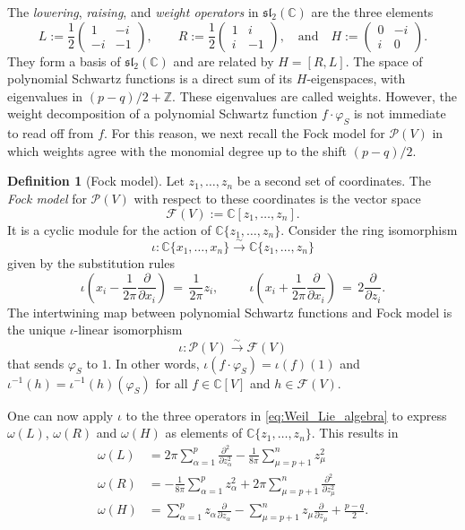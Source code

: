 \documentclass[reqno, 11pt]{amsart} %
\numberwithin{equation}{section}
\theoremstyle{plain}
\theoremstyle{definition}
\newtheorem{definition}[theorem]{Definition}
\theoremstyle{remark}
\newcommand{\lr}{\longrightarrow}
\newcommand{\mbC}{\mathbb{C}}
\newcommand{\mbZ}{\mathbb{Z}}
\newcommand{\mcF}{\mathcal{F}}
\newcommand{\mcP}{\mathcal{P}}
\newcommand{\mfl}{\mathfrak{l}}
\newcommand{\mfs}{\mathfrak{s}}
\newcommand{\mfsl}{\mfs\mfl}
\newcommand{\simlr}{\overset{\sim}{\lr}}
\begin{document}
The \emph{lowering}, \emph{raising}, and \emph{weight operators} in $\mfsl_2(\mbC)$ are the three elements
\begin{equation}\label{eq:LRH}
L := \frac12 \begin{pmatrix}  1 & -i \\ -i  & -1 \end{pmatrix}, \qquad R := \frac12 \begin{pmatrix} 1 &i \\ i & -1 \end{pmatrix} , \quad\text{and}\quad H := \begin{pmatrix} 0 & -i \\ i & 0 \end{pmatrix}.
\end{equation}
They form a basis of $\mfsl_2(\mbC)$ and are related by $H = [R,L]$. The space of polynomial Schwartz functions is a direct sum of its $H$-eigenspaces, with eigenvalues in $(p-q)/2 + \mbZ$. These eigenvalues are called weights. However, the weight decomposition of a polynomial Schwartz function $f\cdot φ_S$ is not immediate to read off from $f$. For this reason, we next recall the Fock model for $\mcP(V)$ in which weights agree with the monomial degree up to the shift $(p-q)/2$.
\begin{definition}[Fock model]\label{def:Fock}
Let $z_1,\ldots,z_n$ be a second set of coordinates. The \emph{Fock model} for $\mcP(V)$ with respect to these coordinates is the vector space
$$\mcF(V) := \mbC[z_1,\ldots,z_n].$$
It is a cyclic module for the action of $\mbC\{z_1,\ldots,z_n\}$. Consider the ring isomorphism
$$ι:\mbC\{x_1,\ldots,x_n\} \simlr \mbC\{z_1,\ldots,z_n\}$$
given by the substitution rules
\begin{equation}\label{eq:Fock_model_intertwiner}
ι\left(x_i - \frac{1}{2π}\frac{\partial}{\partial x_i}\right)\, =\, \frac{1}{2π} z_i, \ \qquad\ ι\left(x_i + \frac{1}{2π}\frac{\partial}{\partial x_i}\right)\, =\, 2 \frac{\partial}{\partial z_i}.
\end{equation}
The intertwining map between polynomial Schwartz functions and Fock model is the unique $ι$-linear isomorphism
$$ι:\mcP(V)\simlr \mcF(V)$$
that sends $φ_S$ to $1$. In other words, $ι(f\cdot φ_S) = ι(f)(1)$ and $ι^{-1}(h) = ι^{-1}(h)(φ_S)$ for all $f\in \mbC[V]$ and $h\in \mcF(V)$.
\end{definition}
One can now apply $ι$ to the three operators in \eqref{eq:Weil_Lie_algebra} to express $ω(L)$, $ω(R)$ and $ω(H)$ as elements of $\mbC\{z_1,\ldots,z_n\}$. This results in
\begin{equation}\label{eq:LRH_Fock}
\begin{split}
\omega(L) &= 2 \pi \sum_{\alpha = 1}^{p} \frac{\partial^2}{\partial z_{\alpha}^2} - \frac{1}{8 \pi} \sum_{\mu = p+1}^{n} z_{\mu}^2 \\[1mm]
\omega(R) &=  -\frac1{8 \pi} \sum_{\alpha = 1}^{p}  z_{\alpha}^2  + 2 \pi \sum_{\mu = p+1}^{n} \frac{\partial^2}{\partial z_{\mu}^2}\\[1mm]
\omega(H) &= \sum_{\alpha = 1}^p z_{\alpha} \frac{\partial}{\partial z_{\alpha}} - \sum_{\mu = p+1}^n z_{\mu} \frac{\partial}{\partial z_\mu} +  \frac{p-q}{2}.
\end{split}
\end{equation}
\end{document}
